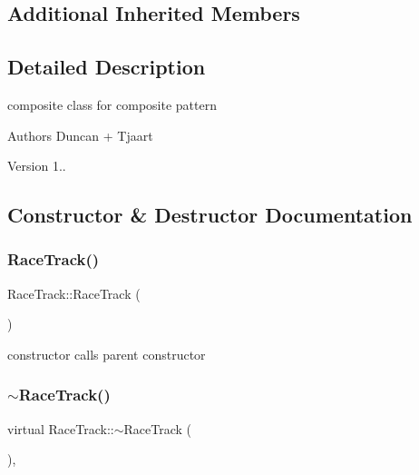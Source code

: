 \subsection*{Additional Inherited Members}


\subsection{Detailed Description}
composite class for composite pattern 

\begin{DoxyAuthor}{Authors}
Duncan + Tjaart 
\end{DoxyAuthor}
\begin{DoxyVersion}{Version}
1.. 
\end{DoxyVersion}


\subsection{Constructor \& Destructor Documentation}
\mbox{\label{class_race_track_ad258a7a5773bedd7971c572c6b291488}} 
\subsubsection{\texorpdfstring{Race\+Track()}{RaceTrack()}}
{\footnotesize\ttfamily Race\+Track\+::\+Race\+Track (\begin{DoxyParamCaption}{ }\end{DoxyParamCaption})\hspace{0.3cm}{\ttfamily [inline]}}

constructor calls parent constructor \mbox{\label{class_race_track_a6959a7fc3487de846ed56fe5fd10a0ff}} 
\subsubsection{\texorpdfstring{$\sim$\+Race\+Track()}{~RaceTrack()}}
{\footnotesize\ttfamily virtual Race\+Track\+::$\sim$\+Race\+Track (\begin{DoxyParamCaption}{ }\end{DoxyParamCaption})\hspace{0.3cm}{\ttfamily [inline]}, {\ttfamily [virtual]}}

